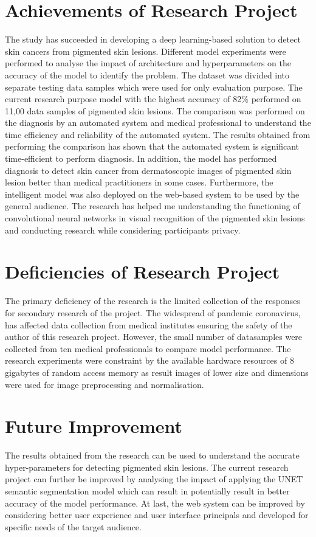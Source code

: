\section{Achievements of Research Project}
The study has succeeded in developing a deep learning-based solution to detect skin cancers from pigmented skin lesions.
Different model experiments were performed to analyse the impact of architecture and hyperparameters on the accuracy of the model to identify the problem. 
The dataset was divided into separate testing data samples which were used for only evaluation purpose. The current research purpose model with the highest accuracy of 82\% performed on 11,00 data samples of pigmented skin lesions. 
The comparison was performed on the diagnosis by an automated system and medical professional to understand the time efficiency and reliability of the automated system. 
The results obtained from performing the comparison has shown that the automated system is significant time-efficient to perform diagnosis. 
In addition, the model has performed diagnosis to detect skin cancer from dermatoscopic images of pigmented skin lesion better than medical practitioners in some cases.
Furthermore, the intelligent model was also deployed on the web-based system to be used by the general audience. 
The research has helped me understanding the functioning of convolutional neural networks in visual recognition of the pigmented skin lesions
and conducting research while considering participants privacy.

\section{Deficiencies of Research Project}
The primary deficiency of the research is the limited collection of the responses for secondary research of the project. 
The widespread of pandemic coronavirus, has affected data collection from medical institutes ensuring the safety of the author of this research project. 
However, the small number of datasamples were collected from ten medical professionals to compare model performance.
The research experiments were constraint by the available hardware resources of 8 gigabytes of random access memory as result images of lower size and dimensions were used for image preprocessing and normalisation.

\section{Future Improvement}
The results obtained from the research can be used to understand the accurate hyper-parameters for detecting pigmented skin lesions. 
The current research project can further be improved by analysing the impact of applying the UNET semantic segmentation model which can result in potentially result in better accuracy of the model performance.
At last, the web system can be improved by considering better user experience and user interface principals and developed for specific needs of the target audience. 